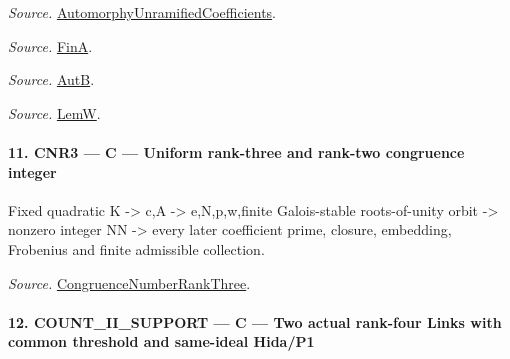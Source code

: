 \documentclass[11pt,a4paper]{article}
\numberwithin{equation}{section}
\theoremstyle{remark}\newtheorem{remark}[theorem]{Remark}
\begin{document}
\emph{Source.} \href{https://github.com/CocoSgt/riemann-hypothesis-lean/blob/7cbf7a0c32fca1badf05931879a37c3f8a2b03b4/src/Development/AutomorphicArithmetic/AutomorphicVarieties/AutomorphicCases/AutomorphyUnramifiedCoefficients.lean#L24-L27}{AutomorphyUnramifiedCoefficients}.

\emph{Source.} \href{https://github.com/CocoSgt/riemann-hypothesis-lean/blob/7cbf7a0c32fca1badf05931879a37c3f8a2b03b4/src/Development/AutomorphicArithmetic/AutomorphicVarieties/AutomorphicCases/AutomorphyUnramifiedCoefficients.lean#L12-L13}{FinA}.

\emph{Source.} \href{https://github.com/CocoSgt/riemann-hypothesis-lean/blob/7cbf7a0c32fca1badf05931879a37c3f8a2b03b4/src/Development/AutomorphicArithmetic/AutomorphicVarieties/AutomorphicCases/AutomorphyUnramifiedCoefficients.lean#L15-L17}{AutB}.

\emph{Source.} \href{https://github.com/CocoSgt/riemann-hypothesis-lean/blob/7cbf7a0c32fca1badf05931879a37c3f8a2b03b4/src/Development/AutomorphicArithmetic/AutomorphicVarieties/AutomorphicCases/AutomorphyUnramifiedCoefficients.lean#L19-L22}{LemW}.



\paragraph{11. CNR3 — C — Uniform rank-three and rank-two congruence integer}

Fixed quadratic K -> c,A -> e,N,p,w,finite Galois-stable roots-of-unity orbit -> nonzero integer NN -> every later coefficient prime, closure, embedding, Frobenius and finite admissible collection.

\emph{Source.} \href{https://github.com/CocoSgt/riemann-hypothesis-lean/blob/7cbf7a0c32fca1badf05931879a37c3f8a2b03b4/src/Development/AutomorphicArithmetic/AutomorphicVarieties/AutomorphicForms/CongruenceNumberRankThree.lean#L125-L140}{CongruenceNumberRankThree}.



\paragraph{12. COUNT\_\allowbreak II\_\allowbreak SUPPORT — C — Two actual rank-four Links with common threshold and same-ideal Hida/P1}
\end{document}
